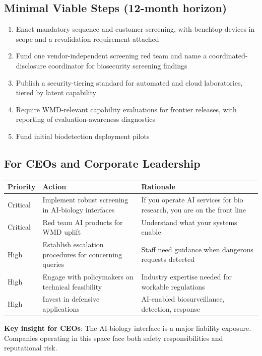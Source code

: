 \documentclass[11pt,letterpaper]{article}
\begin{document}
\subsection{Minimal Viable Steps (12-month horizon)}

\begin{enumerate}
  \item Enact mandatory sequence and customer screening, with benchtop devices in scope and a revalidation requirement attached
  \item Fund one vendor-independent screening red team and name a coordinated-disclosure coordinator for biosecurity screening findings
  \item Publish a security-tiering standard for automated and cloud laboratories, tiered by latent capability
  \item Require WMD-relevant capability evaluations for frontier releases, with reporting of evaluation-awareness diagnostics
  \item Fund initial biodetection deployment pilots
\end{enumerate}

\subsection{For CEOs and Corporate Leadership}

\begin{center}
\small
\begin{tabular}{L{1.5cm}L{5cm}L{5.5cm}}
\toprule
\textbf{Priority} & \textbf{Action} & \textbf{Rationale} \\
\midrule
Critical & Implement robust screening in AI-biology interfaces & If you operate AI services for bio research, you are on the front line \\
Critical & Red team AI products for WMD uplift & Understand what your systems enable \\
High & Establish escalation procedures for concerning queries & Staff need guidance when dangerous requests detected \\
High & Engage with policymakers on technical feasibility & Industry expertise needed for workable regulations \\
High & Invest in defensive applications & AI-enabled biosurveillance, detection, response \\
\bottomrule
\end{tabular}
\end{center}

\textbf{Key insight for CEOs}: The AI-biology interface is a major liability exposure. Companies operating in this space face both safety responsibilities and reputational risk.
\end{document}
